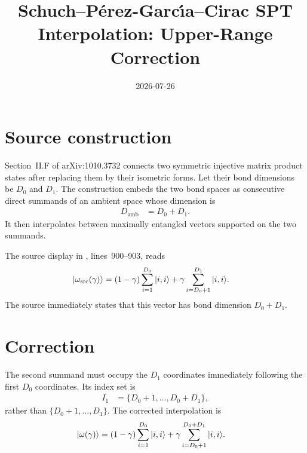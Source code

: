 \documentclass{article}
\title{Schuch--P\'erez-Garc{\'\i}a--Cirac SPT Interpolation: Upper-Range Correction}
\author{}
\date{2026-07-26}
\begin{document}
\maketitle
{}

\section{Source construction}

Section~II.F of arXiv:1010.3732 connects two symmetric injective matrix product
states after replacing them by their isometric forms. Let their bond dimensions
be $D_0$ and $D_1$. The construction embeds the two bond spaces as consecutive
direct summands of an ambient space whose dimension is
\begin{align}
    D_{\mathrm{amb}}
     & =
    D_0+D_1.
    \label{eq:spc11_spt_interpolation_upper_range_ambient_dimension}
\end{align}
It then interpolates between maximally entangled vectors supported on the two
summands.

The source display in
, lines~900--903, reads
\begin{align}
    |\omega_{\mathrm{src}}(\gamma)\rangle
     & =
    (1-\gamma)\sum_{i=1}^{D_0}|i,i\rangle
    +
    \gamma\sum_{i=D_0+1}^{D_1}|i,i\rangle.
    \label{eq:spc11_spt_interpolation_upper_range_source_interpolation}
\end{align}
The source immediately states that this vector has bond dimension
$D_0+D_1$.

\section{Correction}

The second summand must occupy the $D_1$ coordinates immediately following
the first $D_0$ coordinates. Its index set is
\begin{align}
    I_1
     & =
    \{D_0+1,\ldots,D_0+D_1\},
    \label{eq:spc11_spt_interpolation_upper_range_second_index_set}
\end{align}
rather than $\{D_0+1,\ldots,D_1\}$. The corrected interpolation is
\begin{align}
    |\omega(\gamma)\rangle
     & =
    (1-\gamma)\sum_{i=1}^{D_0}|i,i\rangle
    +
    \gamma\sum_{i=D_0+1}^{D_0+D_1}|i,i\rangle.
    \label{eq:spc11_spt_interpolation_upper_range_corrected_interpolation}
\end{align}
\end{document}
